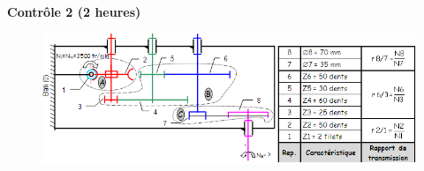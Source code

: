 \documentclass[a4paper,12pt]{article}
\begin{document}
\begin{center}
    \bfseries\Large Contrôle 2 (2 heures)
\end{center}
\MesConsignes %
\bigskip




%
\begin{figure}[h]
  \includegraphics[width=\textwidth]{img_engrenages}
  \caption{}
  \label{}
\end{figure}
\end{document}
